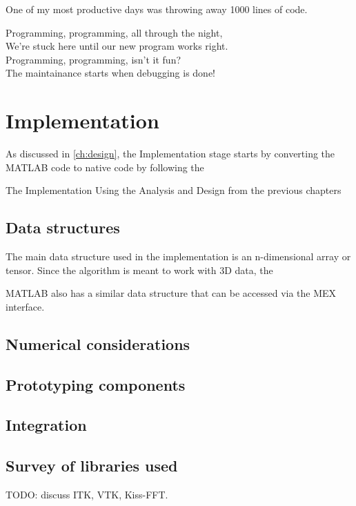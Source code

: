 
\begin{savequote}[0.55\linewidth]
	\begin{fancyquote}
	One of my most productive days was throwing away 1000 lines of code.
	\end{fancyquote}
	\begin{fancyquote}
		Programming, programming, all through the night,\\
		We're stuck here until our new program works right.\\
		Programming, programming, isn't it fun?\\
		The maintainance starts when debugging is done!
	\end{fancyquote}
\end{savequote}
\chapter{Implementation}\label{ch:implementation}

As discussed in \cref{ch:design}, the Implementation stage
starts by converting the MATLAB code to native code by following
the 

The Implementation
Using the Analysis and Design from the previous chapters

\section{Data structures}\label{subsec:impl:ds}


The main data structure used in the implementation is an
n-dimensional array or tensor. Since the algorithm is meant to
work with 3D data, the 

MATLAB also has a similar data structure that can be accessed via the MEX interface.

\section{Numerical considerations}




\section{Prototyping components}

\section{Integration}

\section{Survey of libraries used}

TODO: discuss ITK, VTK, Kiss-FFT.


